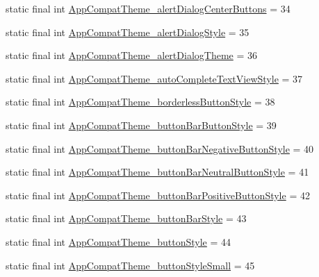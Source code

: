 \begin{DoxyCompactItemize}
static final int \mbox{\hyperlink{classandroid_1_1support_1_1v7_1_1appcompat_1_1R_1_1styleable_a41f73f52e5c3055537001bb7e9997a19}{App\+Compat\+Theme\+\_\+alert\+Dialog\+Center\+Buttons}} = 34
\item 
static final int \mbox{\hyperlink{classandroid_1_1support_1_1v7_1_1appcompat_1_1R_1_1styleable_aedae223963c5754df19376e4cbd784a4}{App\+Compat\+Theme\+\_\+alert\+Dialog\+Style}} = 35
\item 
static final int \mbox{\hyperlink{classandroid_1_1support_1_1v7_1_1appcompat_1_1R_1_1styleable_a63dc331a581ba52aec6c2890516293a6}{App\+Compat\+Theme\+\_\+alert\+Dialog\+Theme}} = 36
\item 
static final int \mbox{\hyperlink{classandroid_1_1support_1_1v7_1_1appcompat_1_1R_1_1styleable_a9f832986176aa6626d5dce08e22d67e4}{App\+Compat\+Theme\+\_\+auto\+Complete\+Text\+View\+Style}} = 37
\item 
static final int \mbox{\hyperlink{classandroid_1_1support_1_1v7_1_1appcompat_1_1R_1_1styleable_ace984cb089e440a80c706fc351c5d324}{App\+Compat\+Theme\+\_\+borderless\+Button\+Style}} = 38
\item 
static final int \mbox{\hyperlink{classandroid_1_1support_1_1v7_1_1appcompat_1_1R_1_1styleable_a77e14c94700b385fd4d168421e983029}{App\+Compat\+Theme\+\_\+button\+Bar\+Button\+Style}} = 39
\item 
static final int \mbox{\hyperlink{classandroid_1_1support_1_1v7_1_1appcompat_1_1R_1_1styleable_a94fab9eb762c4c2d5da18626cbf769e0}{App\+Compat\+Theme\+\_\+button\+Bar\+Negative\+Button\+Style}} = 40
\item 
static final int \mbox{\hyperlink{classandroid_1_1support_1_1v7_1_1appcompat_1_1R_1_1styleable_ac6647a1aabeca99125041267988a52a3}{App\+Compat\+Theme\+\_\+button\+Bar\+Neutral\+Button\+Style}} = 41
\item 
static final int \mbox{\hyperlink{classandroid_1_1support_1_1v7_1_1appcompat_1_1R_1_1styleable_a8edc5d3b0d5adab1b0cf94fe2dc2bfdc}{App\+Compat\+Theme\+\_\+button\+Bar\+Positive\+Button\+Style}} = 42
\item 
static final int \mbox{\hyperlink{classandroid_1_1support_1_1v7_1_1appcompat_1_1R_1_1styleable_a9ffc785733597a5af41aae74056d6e24}{App\+Compat\+Theme\+\_\+button\+Bar\+Style}} = 43
\item 
static final int \mbox{\hyperlink{classandroid_1_1support_1_1v7_1_1appcompat_1_1R_1_1styleable_a4874e1217a8edb3ddeba23bbab028d29}{App\+Compat\+Theme\+\_\+button\+Style}} = 44
\item 
static final int \mbox{\hyperlink{classandroid_1_1support_1_1v7_1_1appcompat_1_1R_1_1styleable_a70ffb6778fe591be92a4e977041ceb1b}{App\+Compat\+Theme\+\_\+button\+Style\+Small}} = 45

\end{DoxyCompactItemize}
